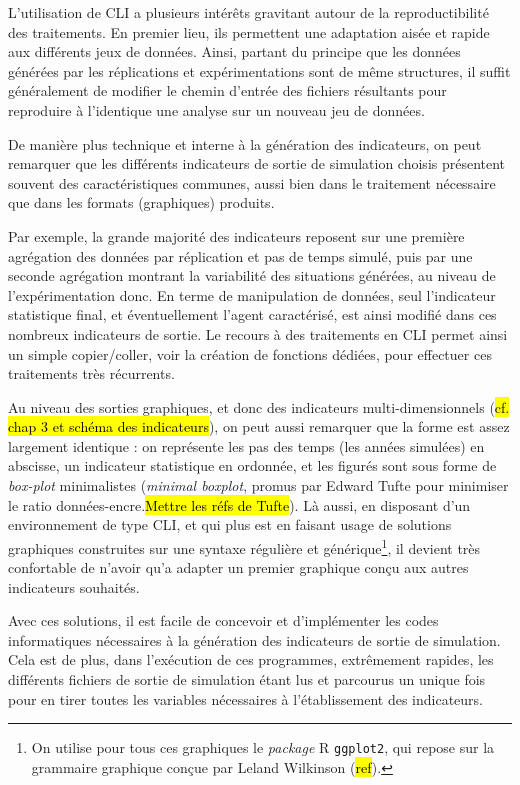 	L'utilisation de CLI a plusieurs intérêts gravitant autour de la reproductibilité des traitements.
	En premier lieu, ils permettent une adaptation aisée et rapide aux différents jeux de données.
	Ainsi, partant du principe que les données générées par les réplications et expérimentations sont de même structures, il suffit généralement de modifier le chemin d'entrée des fichiers résultants pour reproduire à l'identique une analyse sur un nouveau jeu de données.

	De manière plus technique et interne à la génération des indicateurs, on peut remarquer que les différents indicateurs de sortie de simulation choisis présentent souvent des caractéristiques communes, aussi bien dans le traitement nécessaire que dans les formats (graphiques) produits.

	Par exemple, la grande majorité des indicateurs reposent sur une première agrégation des données par réplication et pas de temps simulé, puis par une seconde agrégation montrant la variabilité des situations générées, au niveau de l'expérimentation donc.
	En terme de manipulation de données, seul l'indicateur statistique final, et éventuellement l'agent caractérisé, est ainsi modifié dans ces nombreux indicateurs de sortie.
	Le recours à des traitements en CLI permet ainsi un simple copier/coller, voir la création de fonctions dédiées, pour effectuer ces traitements très récurrents.

	Au niveau des sorties graphiques, et donc des indicateurs multi-dimensionnels (\hl{cf. chap 3 et schéma des indicateurs}), on peut aussi remarquer que la forme est assez largement identique : on représente les pas des temps (les années simulées) en abscisse, un indicateur statistique en ordonnée, et les figurés sont sous forme de \textit{box-plot} minimalistes (\og \textit{minimal boxplot}\fg{}, promus par Edward Tufte pour minimiser le ratio données-encre.\hl{Mettre les réfs de Tufte}).
	Là aussi, en disposant d'un environnement de type CLI, et qui plus est en faisant usage de solutions graphiques construites sur une syntaxe régulière et générique\footnote{
	On utilise pour tous ces graphiques le \textit{package} R \texttt{ggplot2}, qui repose sur la grammaire graphique conçue par Leland Wilkinson (\hl{ref}).
	}, il devient très confortable de n'avoir qu'a adapter un premier graphique conçu aux autres indicateurs souhaités.

	Avec ces solutions, il est facile de concevoir et d'implémenter les codes informatiques nécessaires à la génération des indicateurs de sortie de simulation.
	Cela est de plus, dans l'exécution de ces programmes, extrêmement rapides, les différents fichiers de sortie de simulation étant lus et parcourus un unique fois pour en tirer toutes les variables nécessaires à l'établissement des indicateurs.

